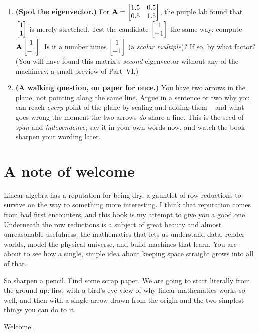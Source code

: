 \begin{enumerate}
\item \textbf{(Spot the eigenvector.)} For $\mathbf{A}=\begin{bmatrix}1.5 & 0.5 \\ 0.5 &
1.5\end{bmatrix}$, the purple lab found that $\begin{bmatrix}1\\1\end{bmatrix}$ is merely stretched. Test the
candidate $\begin{bmatrix}1\\-1\end{bmatrix}$ the same way: compute $\mathbf{A}\begin{bmatrix}1\\-1\end{bmatrix}$. Is it a
number times $\begin{bmatrix}1\\-1\end{bmatrix}$ (a \emph{scalar multiple})? If so, by what factor? (You will have found
this matrix's \emph{second} eigenvector without any of the machinery, a small
preview of Part~VI.)

\item \textbf{(A walking question, on paper for once.)} You have two arrows in
the plane, not pointing along the same line. Argue in a sentence or two why you
can reach \emph{every} point of the plane by scaling and adding them -- and what
goes wrong the moment the two arrows \emph{do} share a line. This is the seed of
\emph{span} and \emph{independence}; say it in your own words now, and watch the
book sharpen your wording later.
\end{enumerate}

\section*{A note of welcome}

Linear algebra has a reputation for being dry, a gauntlet of row reductions to
survive on the way to something more interesting. I think that reputation comes
from bad first encounters, and this book is my attempt to give you a good
one. Underneath the row reductions is a subject of great beauty and almost
unreasonable usefulness: the mathematics that lets us understand data, render
worlds, model the physical universe, and build machines that learn. You are
about to see how a single, simple idea about keeping space straight grows into
all of that.

So sharpen a pencil. Find some scrap paper. We are going to start
literally from the ground up: first with a bird's-eye view of why linear
mathematics works so well, and then with a single arrow drawn from the origin
and the two simplest things you can do to it.

Welcome.

